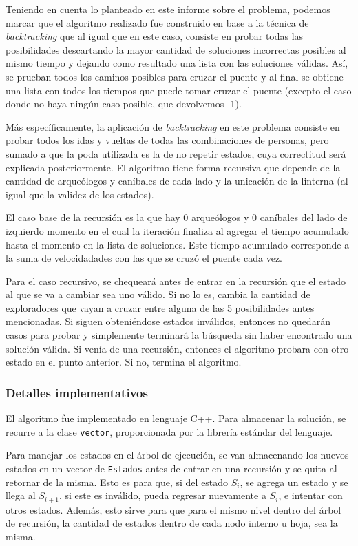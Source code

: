         Teniendo en cuenta lo planteado en este informe sobre el problema, podemos marcar que el algoritmo realizado fue construido en base a la técnica de \emph{backtracking} que al igual que en este caso, consiste en probar todas las posibilidades descartando la mayor cantidad de soluciones incorrectas posibles al mismo tiempo y dejando como resultado una lista con las soluciones válidas. Así, se prueban todos los caminos posibles para cruzar el puente y al final se obtiene una lista con todos los tiempos que puede tomar cruzar el puente (excepto el caso donde no haya ningún caso posible, que devolvemos -1).

        Más específicamente, la aplicación de \emph{backtracking} en este problema consiste en probar todos los idas y vueltas de todas las combinaciones de personas, pero sumado a que la poda utilizada es la de no repetir estados, cuya correctitud será explicada posteriormente. El algoritmo tiene forma recursiva que depende de la cantidad de arqueólogos y caníbales de cada lado y la unicación de la linterna (al igual que la validez de los estados).

        El caso base de la recursión es la que hay 0 arqueólogos y 0 caníbales del lado de izquierdo momento en el cual la iteración finaliza al agregar el tiempo acumulado hasta el momento en la lista de soluciones. Este tiempo acumulado corresponde a la suma de velocidadades con las que se cruzó el puente cada vez.

        Para el caso recursivo, se chequeará antes de entrar en la recursión que el estado al que se va a cambiar sea uno válido. Si no lo es, cambia la cantidad de exploradores que vayan a cruzar entre alguna de las 5 posibilidades antes mencionadas. Si siguen obteniéndose estados inválidos, entonces no quedarán casos para probar y simplemente terminará la búsqueda sin haber encontrado una solución válida. Si venía de una recursión, entonces el algoritmo probara con otro estado en el punto anterior. Si no, termina el algoritmo.



        \subsubsection{Detalles implementativos}
            El algoritmo fue implementado en lenguaje C++. Para almacenar la solución, se recurre a la clase \texttt{vector}, proporcionada por la librería estándar del lenguaje.

            Para manejar los estados en el árbol de ejecución, se van almacenando los nuevos estados en un vector de \texttt{Estados} antes de entrar en una recursión y se quita al retornar de la misma. Esto es para que, si del estado $S_{i}$, se agrega un estado y se llega al $S_{i+1}$, si este es inválido, pueda regresar nuevamente a $S_{i}$, e intentar con otros estados. Además, esto sirve para que para el mismo nivel dentro del árbol de recursión, la cantidad de estados dentro de cada nodo interno u hoja, sea la misma.

